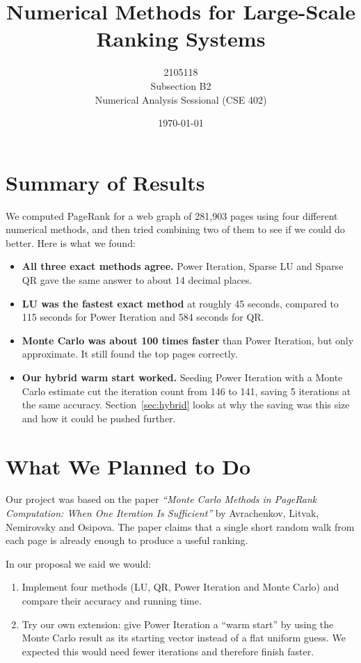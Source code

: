 \documentclass[11pt,a4paper]{article}
\title{\textbf{Numerical Methods for Large-Scale Ranking Systems}}
\author{%
2105118 \quad 2105119 \quad 2105110 \quad 2105115 \quad 2105107\\[0.4em]
Subsection B2 \\[0.4em]
\normalsize Numerical Analysis Sessional (CSE 402)
}
\date{\today}
\begin{document}
\maketitle

\section*{Summary of Results}

We computed PageRank for a web graph of 281{,}903 pages using four different
numerical methods, and then tried combining two of them to see if we could do better.
Here is what we found:

\begin{itemize}
  \item \textbf{All three exact methods agree.} Power Iteration, Sparse LU and Sparse
        QR gave the same answer to about 14 decimal places.
  \item \textbf{LU was the fastest exact method} at roughly 45 seconds, compared to
        115 seconds for Power Iteration and 584 seconds for QR.
  \item \textbf{Monte Carlo was about 100 times faster} than Power Iteration, but only
        approximate. It still found the top pages correctly.
  \item \textbf{Our hybrid warm start worked.} Seeding Power Iteration with a Monte
        Carlo estimate cut the iteration count from 146 to 141, saving 5 iterations at
        the same accuracy. Section~\ref{sec:hybrid} looks at why the saving was this
        size and how it could be pushed further.
\end{itemize}

\section{What We Planned to Do}

Our project was based on the paper \emph{``Monte Carlo Methods in PageRank
Computation: When One Iteration Is Sufficient''} by Avrachenkov, Litvak, Nemirovsky
and Osipova. The paper claims that a single short random walk from each page is
already enough to produce a useful ranking.

In our proposal we said we would:

\begin{enumerate}
  \item Implement four methods (LU, QR, Power Iteration and Monte Carlo) and
        compare their accuracy and running time.
  \item Try our own extension: give Power Iteration a ``warm start'' by using the
        Monte Carlo result as its starting vector instead of a flat uniform guess. We
        expected this would need fewer iterations and therefore finish faster.
\end{enumerate}
\end{document}
